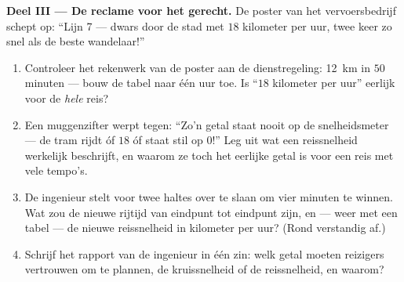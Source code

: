 \begin{problem}
\medskip\noindent\textbf{Deel III --- De reclame voor het gerecht.}
De poster van het vervoersbedrijf schept op: ``Lijn 7 --- dwars door
de stad met $18$ kilometer per uur, twee keer zo snel als de beste
wandelaar!''
\begin{enumerate}[resume]
  \item Controleer het rekenwerk van de poster aan de
        dienstregeling: \qty{12}{km} in $50$ minuten --- bouw de
        tabel naar één uur toe. Is ``$18$ kilometer per uur'' eerlijk
        voor de \emph{hele} reis?
  \item Een muggenzifter werpt tegen: ``Zo'n getal staat nooit op de
        snelheidsmeter --- de tram rijdt óf $18$ óf staat stil op
        $0$!'' Leg uit wat een reissnelheid werkelijk beschrijft, en
        waarom ze toch het eerlijke getal is voor een reis met vele
        tempo's.
  \item De ingenieur stelt voor twee haltes over te slaan om vier
        minuten te winnen. Wat zou de nieuwe rijtijd van eindpunt tot
        eindpunt zijn, en --- weer met een tabel --- de nieuwe
        reissnelheid in kilometer per uur? (Rond verstandig af.)
  \item Schrijf het rapport van de ingenieur in één zin: welk getal
        moeten reizigers vertrouwen om te plannen, de
        kruissnelheid of de reissnelheid, en waarom?
\end{enumerate}
\end{problem}
